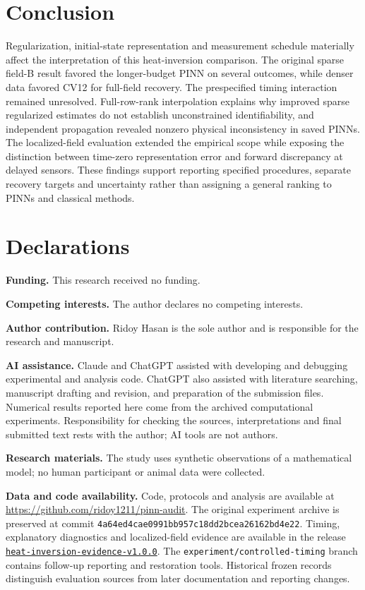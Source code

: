 \documentclass[11pt,a4paper]{article}
\begin{document}
\section{Conclusion}
Regularization, initial-state representation and measurement schedule materially affect the interpretation of this heat-inversion comparison. The original sparse field-B result favored the longer-budget PINN on several outcomes, while denser data favored CV12 for full-field recovery. The prespecified timing interaction remained unresolved. Full-row-rank interpolation explains why improved sparse regularized estimates do not establish unconstrained identifiability, and independent propagation revealed nonzero physical inconsistency in saved PINNs. The localized-field evaluation extended the empirical scope while exposing the distinction between time-zero representation error and forward discrepancy at delayed sensors. These findings support reporting specified procedures, separate recovery targets and uncertainty rather than assigning a general ranking to PINNs and classical methods.

\section*{Declarations}
\textbf{Funding.} This research received no funding.

\noindent\textbf{Competing interests.} The author declares no competing interests.

\noindent\textbf{Author contribution.} Ridoy Hasan is the sole author and is responsible for the research and manuscript.

\noindent\textbf{AI assistance.} Claude and ChatGPT assisted with developing and debugging experimental and analysis code. ChatGPT also assisted with literature searching, manuscript drafting and revision, and preparation of the submission files. Numerical results reported here come from the archived computational experiments. Responsibility for checking the sources, interpretations and final submitted text rests with the author; AI tools are not authors.

\noindent\textbf{Research materials.} The study uses synthetic observations of a mathematical model; no human participant or animal data were collected.

\noindent\textbf{Data and code availability.} Code, protocols and analysis are available at \url{https://github.com/ridoy1211/pinn-audit}. The original experiment archive is preserved at commit \texttt{4a64ed4cae0991bb957c18dd2bcea26162bd4e22}. Timing, explanatory diagnostics and localized-field evidence are available in the release \href{https://github.com/ridoy1211/pinn-audit/releases/tag/heat-inversion-evidence-v1.0.0}{\texttt{heat-inversion-evidence-v1.0.0}}. The \texttt{experiment/controlled-timing} branch contains follow-up reporting and restoration tools. Historical frozen records distinguish evaluation sources from later documentation and reporting changes.
\end{document}
